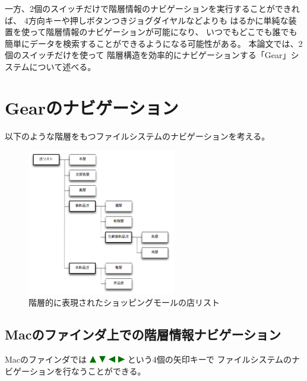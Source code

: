 \documentclass[twoside]{wiss}
\def\GEAR{\textsf{Gear}}
\def\uptriangle{ \includegraphics[width=3mm,bb=0 0 36 36]{figures/uptriangle.pdf} }
\def\downtriangle{ \includegraphics[width=3mm,bb=0 0 36 36]{figures/downtriangle.pdf} }
\def\righttriangle{ \includegraphics[width=3mm,bb=0 0 36 36]{figures/righttriangle.pdf} }
\def\lefttriangle{ \includegraphics[width=3mm,bb=0 0 36 36]{figures/lefttriangle.pdf} }
\begin{document}
一方、2個のスイッチだけで階層情報のナビゲーションを実行することができれば、
4方向キーや押しボタンつきジョグダイヤルなどよりも
はるかに単純な装置を使って階層情報のナビゲーションが可能になり、
いつでもどこでも誰でも簡単にデータを検索することができるようになる可能性がある。
%
本論文では、2個のスイッチだけを使って
階層構造を効率的にナビゲーションする「{\GEAR}」システムについて述べる。



\section{{\GEAR}のナビゲーション}
\label{description}

% 

以下のような階層をもつファイルシステムのナビゲーションを考える。

\begin{figure}[H]
\centerline{\includegraphics[width=65mm,bb=0 0 509 502]{figures/ae9216b00626f9c4eea44cc380f25886.png}}
\caption{階層的に表現されたショッピングモールの店リスト}
\label{screenshot1}
\end{figure}

\subsection{Macのファインダ上での階層情報ナビゲーション}

Macのファインダでは
{\uptriangle}{\downtriangle}{\lefttriangle}{\righttriangle}という4個の矢印キーで
ファイルシステムのナビゲーションを行なうことができる。
\end{document}
